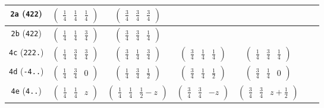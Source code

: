 \documentclass[fleqn,9pt,landscape]{jsarticle}
\begin{document}
\begin{center}
\begin{longtable}{ccccccc}
{\tt 2a} ({\tt 422}) & $ \begin{pmatrix} \frac{1}{4} & \frac{1}{4} & \frac{1}{4} \end{pmatrix} $ & $ \begin{pmatrix} \frac{3}{4} & \frac{3}{4} & \frac{3}{4} \end{pmatrix} $ & $  $ & $  $ & $  $ & $  $ \\ \hline
{\tt 2b} ({\tt 422}) & $ \begin{pmatrix} \frac{1}{4} & \frac{1}{4} & \frac{3}{4} \end{pmatrix} $ & $ \begin{pmatrix} \frac{3}{4} & \frac{3}{4} & \frac{1}{4} \end{pmatrix} $ & $  $ & $  $ & $  $ & $  $ \\ \hline
{\tt 4c} ({\tt 222.}) & $ \begin{pmatrix} \frac{1}{4} & \frac{3}{4} & \frac{3}{4} \end{pmatrix} $ & $ \begin{pmatrix} \frac{3}{4} & \frac{1}{4} & \frac{3}{4} \end{pmatrix} $ & $ \begin{pmatrix} \frac{3}{4} & \frac{1}{4} & \frac{1}{4} \end{pmatrix} $ & $ \begin{pmatrix} \frac{1}{4} & \frac{3}{4} & \frac{1}{4} \end{pmatrix} $ & $  $ & $  $ \\ \hline
{\tt 4d} ({\tt -4..}) & $ \begin{pmatrix} \frac{1}{4} & \frac{3}{4} & 0 \end{pmatrix} $ & $ \begin{pmatrix} \frac{1}{4} & \frac{3}{4} & \frac{1}{2} \end{pmatrix} $ & $ \begin{pmatrix} \frac{3}{4} & \frac{1}{4} & \frac{1}{2} \end{pmatrix} $ & $ \begin{pmatrix} \frac{3}{4} & \frac{1}{4} & 0 \end{pmatrix} $ & $  $ & $  $ \\ \hline
{\tt 4e} ({\tt 4..}) & $ \begin{pmatrix} \frac{1}{4} & \frac{1}{4} & z \end{pmatrix} $ & $ \begin{pmatrix} \frac{1}{4} & \frac{1}{4} & \frac{1}{2} - z \end{pmatrix} $ & $ \begin{pmatrix} \frac{3}{4} & \frac{3}{4} & - z \end{pmatrix} $ & $ \begin{pmatrix} \frac{3}{4} & \frac{3}{4} & z + \frac{1}{2} \end{pmatrix} $ & $  $ & $  $ \\ \hline

\end{longtable}
\end{center}
\end{document}

